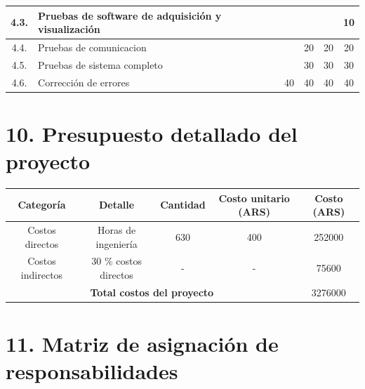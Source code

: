 \documentclass[11pt]{charter}
\begin{document}
\begin{table}[htbp]
\begin{tabularx}{\linewidth}{|c|X|c|c|c|c|}
4.3.                                                                                           & Pruebas de software de adquisición y visualización                                                  &          &                           &               & 10                \\ \hline
4.4.                                                                                           & Pruebas de comunicacion                                                                             &          & 20                        & 20            & 20                \\ \hline
4.5.                                                                                           & Pruebas de sistema completo                                                                         &          & 30                        & 30            & 30                \\ \hline
4.6.                                                                                           & Corrección de errores                                                                               & 40       & 40                        & 40            & 40                \\ \hline
\end{tabularx}
\end{table}


\section{10. Presupuesto detallado del proyecto}
\label{sec:presupuesto}

\begin{table}[htbp]
\begin{tabular}{|c|c|c|c|c|}
\hline
\rowcolor[HTML]{C0C0C0} 
Categoría         & Detalle               & Cantidad & Costo unitario (ARS) & Costo (ARS) \\ \hline
Costos directos   & Horas de ingeniería   & 630      & 400                  & 252000      \\ \hline
Costos indirectos & 30 \% costos directos & -        & -                    & 75600       \\ \hline
\multicolumn{4}{|c|}{\textbf{Total costos del proyecto}}                    & 3276000     \\ \hline
\end{tabular}
\end{table}

\section{11. Matriz de asignación de responsabilidades}
\label{sec:responsabilidades}
\end{document}
